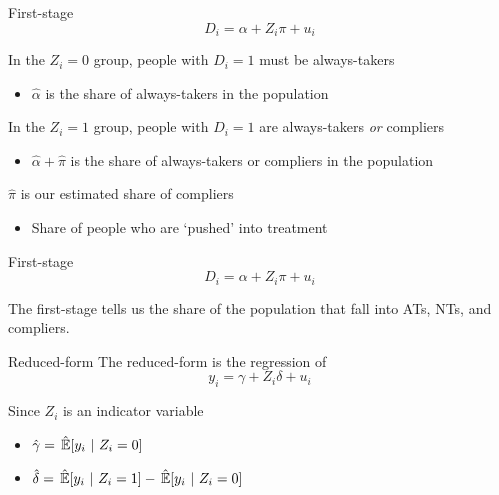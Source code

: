 \documentclass[aspectratio=169,t,11pt,table]{beamer}
\begin{document}
\begin{frame}{First-stage}
  \vspace*{-\bigskipamount}
  $$
    D_i = \alpha + Z_i \pi + u_i
  $$

  In the $Z_i = 0$ group, people with $D_i = 1$ must be always-takers
  \begin{itemize}
    \item $\hat{\alpha}$ is the share of always-takers in the population
  \end{itemize}
  
  \pause
  \bigskip
  In the $Z_i = 1$ group, people with $D_i = 1$ are always-takers \emph{or} compliers
  \begin{itemize}
    \item $\hat{\alpha} + \hat{\pi}$ is the share of always-takers or compliers in the population
  \end{itemize}

  \bigskip
  \pause
  $\hat{\pi}$ is our estimated share of compliers
  \begin{itemize}
    \item Share of people who are `pushed' into treatment
  \end{itemize}
\end{frame}

\begin{frame}{First-stage}
  \vspace*{-\bigskipamount}
  $$
    D_i = \alpha + Z_i \pi + u_i
  $$

  The first-stage tells us the share of the population that fall into ATs, NTs, and compliers.
\end{frame}

\begin{frame}{Reduced-form}
  The reduced-form is the regression of 
  $$
    y_i = \gamma + Z_i \delta + u_i
  $$

  Since $Z_i$ is an indicator variable
  \begin{itemize}
    \item $\hat{\gamma} = \expechat{y_i}{Z_i = 0}$
    \item $\hat{\delta} = \expechat{y_i}{Z_i = 1} - \expechat{y_i}{Z_i = 0}$ 
  \end{itemize}
\end{frame}
\end{document}
